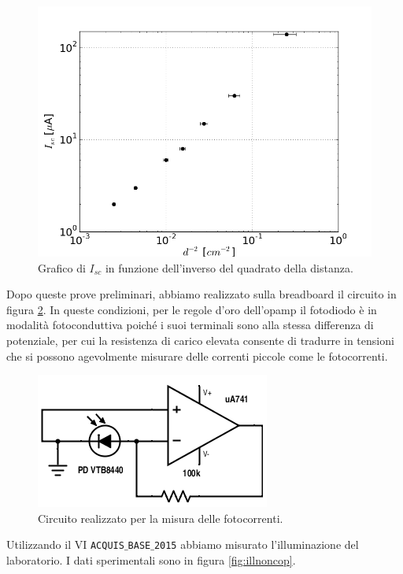 \documentclass[journal, a4paper]{IEEEtran}
\begin{document}
\begin{figure}[htp]
\centering
\includegraphics[scale=.4]{illum_cor2}
\caption{Grafico di $I_{sc}$ in funzione dell'inverso del quadrato della distanza.}
\label{fig:illum_cor}
\end{figure}

Dopo queste prove preliminari, abbiamo realizzato sulla breadboard il circuito in figura \ref{fig:es4}. In queste condizioni, per le regole d'oro dell'opamp il fotodiodo è in modalità fotoconduttiva poiché i suoi terminali sono alla stessa differenza di potenziale, per cui la resistenza di carico elevata consente di tradurre in tensioni che si possono agevolmente misurare delle correnti piccole come le fotocorrenti.

\begin{figure}[htp]
\centering
\includegraphics[scale=.6]{ES4}
\caption{Circuito realizzato per la misura delle fotocorrenti.}
\label{fig:es4}
\end{figure}

Utilizzando il VI \texttt{ACQUIS$\_$BASE$\_$2015} abbiamo misurato l'illuminazione del laboratorio. I dati sperimentali sono in figura \ref{fig:illnoncop}.
\end{document}
